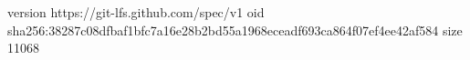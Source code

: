 version https://git-lfs.github.com/spec/v1
oid sha256:38287c08dfbaf1bfc7a16e28b2bd55a1968eceadf693ca864f07ef4ee42af584
size 11068
